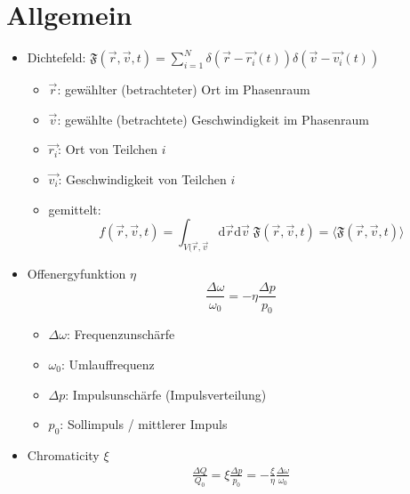 \documentclass[12pt]{article}%
\newcommand{\itemf}{\item[$\circ$]}
\begin{document}
\section{Allgemein}	

\begin{itemize}

\item Dichtefeld: $\mathfrak{F}(\vec{r}, \vec{v}, t) = \sum_{i=1}^{N} \delta(\vec{r} - \vec{r_i}(t)) \delta(\vec{v} - \vec{v_i}(t))$

	\begin{itemize}
		
		\item $\vec{r}$: gewählter (betrachteter) Ort im Phasenraum
		\item $\vec{v}$: gewählte (betrachtete) Geschwindigkeit im Phasenraum
		\item $\vec{r_i}$: Ort von Teilchen $i$
		\item $\vec{v_i}$: Geschwindigkeit von Teilchen $i$
		
	\end{itemize}
	\begin{itemize}
		
		\itemf gemittelt: \[ f(\vec{r}, \vec{v}, t) = \int_{V(\vec{r}, \vec{v}} \mathrm{d}\vec{r} \mathrm{d}\vec{v} \;  \mathfrak{F}(\vec{r}, \vec{v}, t) = \langle \mathfrak{F}(\vec{r}, \vec{v}, t) \rangle \]
	\end{itemize}

\item Offenergyfunktion $\eta$ 
\begin{equation}\label{eq:offsetenergy}
\frac{\Delta \omega}{\omega_0} = - \eta \frac{\Delta p}{p_0}
\end{equation}

	\begin{itemize}
	
		\item $\Delta \omega$: Frequenzunschärfe
		\item $\omega_0$: Umlauffrequenz
		\item $\Delta p$: Impulsunschärfe (Impulsverteilung)
		\item $p_0$: Sollimpuls / mittlerer Impuls
	
	\end{itemize}

\item Chromaticity $\xi$
\begin{align} \label{eq:chromaticity}
\frac{\Delta Q}{Q_0} = \xi \frac{\Delta p}{p_0} = - \frac{\xi}{\eta} \frac{\Delta \omega}{\omega_0}
\end{align}


\end{itemize}
\end{document}
